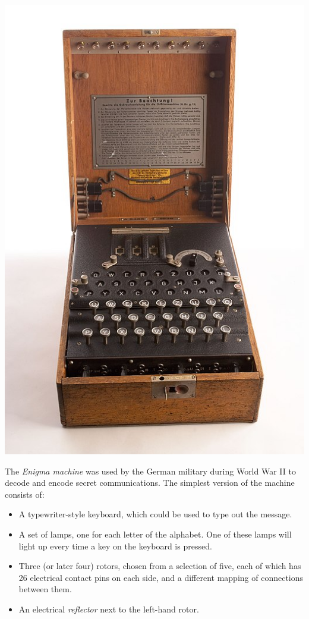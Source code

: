 \documentclass[
  letterpaper,
  DIV=11,
  numbers=noendperiod]{scrreprt}
\providecommand{\tightlist}{%
  \setlength{\itemsep}{0pt}\setlength{\parskip}{0pt}}\usepackage{longtable,booktabs,array}
\begin{document}
\includegraphics{images/Enigma-Machine.jpeg}

The \emph{Enigma machine} was used by the German military during World
War II to decode and encode secret communications. The simplest version
of the machine consists of:

\begin{itemize}
\tightlist
\item
  A typewriter-style keyboard, which could be used to type out the
  message.
\item
  A set of lamps, one for each letter of the alphabet. One of these
  lamps will light up every time a key on the keyboard is pressed.
\item
  Three (or later four) rotors, chosen from a selection of five, each of
  which has 26 electrical contact pins on each side, and a different
  mapping of connections between them.
\item
  An electrical \emph{reflector} next to the left-hand rotor.
\end{itemize}
\end{document}
